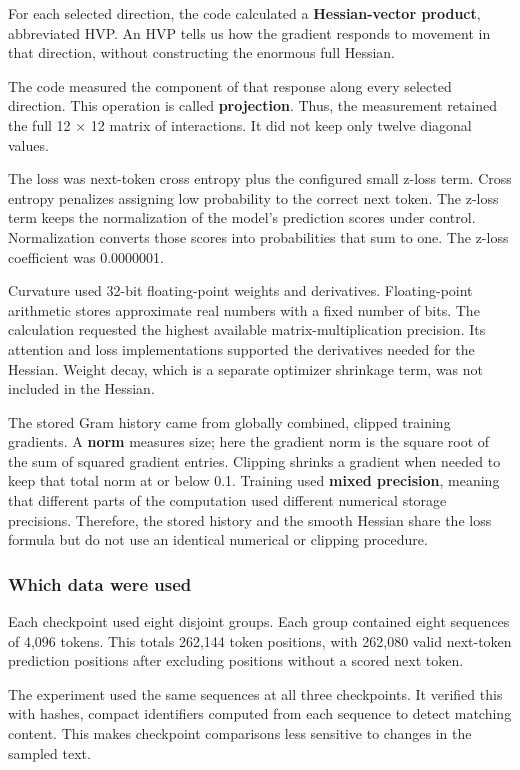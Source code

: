 \documentclass[
  14pt,
  letterpaper,
]{extarticle}
\begin{document}
For each selected direction, the code calculated a
\textbf{Hessian-vector product}, abbreviated HVP. An HVP tells us how
the gradient responds to movement in that direction, without
constructing the enormous full Hessian.

The code measured the component of that response along every selected
direction. This operation is called \textbf{projection}. Thus, the
measurement retained the full 12 × 12 matrix of interactions. It did not
keep only twelve diagonal values.

The loss was next-token cross entropy plus the configured small z-loss
term. Cross entropy penalizes assigning low probability to the correct
next token. The z-loss term keeps the normalization of the model's
prediction scores under control. Normalization converts those scores
into probabilities that sum to one. The z-loss coefficient was
0.0000001.

Curvature used 32-bit floating-point weights and derivatives.
Floating-point arithmetic stores approximate real numbers with a fixed
number of bits. The calculation requested the highest available
matrix-multiplication precision. Its attention and loss implementations
supported the derivatives needed for the Hessian. Weight decay, which is
a separate optimizer shrinkage term, was not included in the Hessian.

The stored Gram history came from globally combined, clipped training
gradients. A \textbf{norm} measures size; here the gradient norm is the
square root of the sum of squared gradient entries. Clipping shrinks a
gradient when needed to keep that total norm at or below 0.1. Training
used \textbf{mixed precision}, meaning that different parts of the
computation used different numerical storage precisions. Therefore, the
stored history and the smooth Hessian share the loss formula but do not
use an identical numerical or clipping procedure.

\subsubsection{Which data were used}\label{which-data-were-used}

Each checkpoint used eight disjoint groups. Each group contained eight
sequences of 4,096 tokens. This totals 262,144 token positions, with
262,080 valid next-token prediction positions after excluding positions
without a scored next token.

The experiment used the same sequences at all three checkpoints. It
verified this with hashes, compact identifiers computed from each
sequence to detect matching content. This makes checkpoint comparisons
less sensitive to changes in the sampled text.
\end{document}

